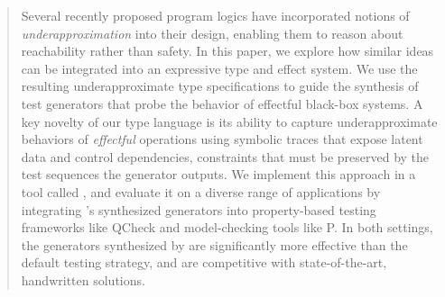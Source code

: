 \documentclass[acmsmall,screen,review,anonymous]{acmart}\settopmatter{printfolios=true,printccs=false,printacmref=false}
\begin{document}
\begin{abstract}
  Several recently proposed program logics have incorporated notions
  of \emph{underapproximation} into their design, enabling them to
  reason about reachability rather than safety. In this paper, we
  explore how similar ideas can be integrated into an expressive type
  and effect system.  We use the resulting underapproximate type
  specifications to guide the synthesis of test generators that probe
  the behavior of effectful black-box systems. A key novelty of our
  type language is its ability to capture underapproximate behaviors
  of \emph{effectful} operations using symbolic traces that expose
  latent data and control dependencies, constraints that must be
  preserved by the test sequences the generator outputs.  We
  implement this approach in a tool called \name{}, and evaluate it on
  a diverse range of applications by integrating \name{}'s synthesized
  generators into property-based testing frameworks like QCheck and
  model-checking tools like P.  In both settings, the generators
  synthesized by \name{} are significantly more effective than the
  default testing strategy, and are competitive with state-of-the-art,
  handwritten solutions.
\end{abstract}




\end{document}

